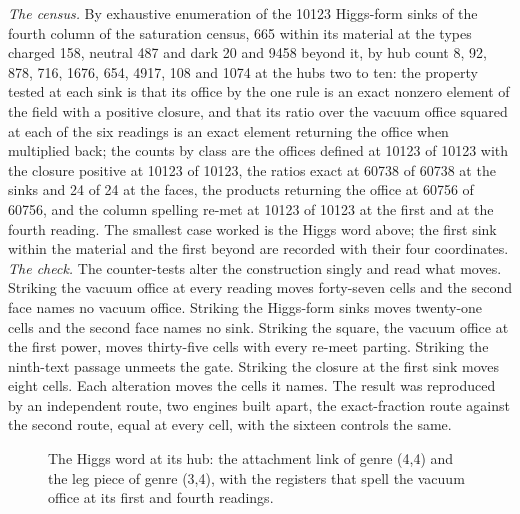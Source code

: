 \begin{chproof}
\textit{The census.} By exhaustive enumeration of the 10123 Higgs-form sinks of the fourth column of the saturation census, 665 within its material at the types charged 158, neutral 487 and dark 20 and 9458 beyond it, by hub count 8, 92, 878, 716, 1676, 654, 4917, 108 and 1074 at the hubs two to ten: the property tested at each sink is that its office by the one rule is an exact nonzero element of the field with a positive closure, and that its ratio over the vacuum office squared at each of the six readings is an exact element returning the office when multiplied back; the counts by class are the offices defined at 10123 of 10123 with the closure positive at 10123 of 10123, the ratios exact at 60738 of 60738 at the sinks and 24 of 24 at the faces, the products returning the office at 60756 of 60756, and the column spelling re-met at 10123 of 10123 at the first and at the fourth reading. The smallest case worked is the Higgs word above; the first sink within the material and the first beyond are recorded with their four coordinates.
\textit{The check.} The counter-tests alter the construction singly and read what moves. Striking the vacuum office at every reading moves forty-seven cells and the second face names no vacuum office. Striking the Higgs-form sinks moves twenty-one cells and the second face names no sink. Striking the square, the vacuum office at the first power, moves thirty-five cells with every re-meet parting. Striking the ninth-text passage unmeets the gate. Striking the closure at the first sink moves eight cells. Each alteration moves the cells it names. The result was reproduced by an independent route, two engines built apart, the exact-fraction route against the second route, equal at every cell, with the sixteen controls the same.
\begin{figure}[h]\centering{}\caption{The Higgs word at its hub: the attachment link of genre (4,4) and the leg piece of genre (3,4), with the registers that spell the vacuum office at its first and fourth readings.}\end{figure}
\end{chproof}
\par\medskip{}\label{narr:close:6-10}\par
